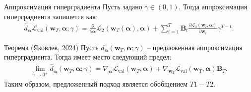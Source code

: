 \documentclass[aspectratio=169]{beamer}
\def\lval{\mathcal{L}_{\mathrm{val}}}
\newcommand{\vect}[1]{\boldsymbol{\mathbf{#1}}}
\begin{document}
\begin{frame}{Аппроксимация гиперградиента}
  Пусть задано $\gamma \in (0, 1)$. Тогда аппроксимация гиперградиента запишется как:
  \begin{align*}
    \hat{d}_{\boldsymbol{\alpha}}\lval(\vect{w}_T, \vect{\alpha}; \gamma) = \frac{\partial}{\partial \boldsymbol{\alpha}}\mathcal{L}_2(\mathbf{w}_T(\boldsymbol{\alpha}), \boldsymbol{\alpha}) +
    \sum_{t=1}^T \mathbf{B}_t\frac{\partial\mathcal{L}_2(\mathbf{w}_t, \boldsymbol{\alpha})}{\partial \mathbf{w}_t}\gamma^{T-t}.
  \end{align*}
  \begin{block}{Теорема (Яковлев, 2024)}
    Пусть $\hat{d}_{\vect{\alpha}}(\vect{w}_T, \vect{\alpha}; \gamma)$ -- предложенная аппроксимация гиперградиента. Тогда имеет место следующий предел:
    \begin{align}
        \lim_{\gamma \to 0^+}\hat{d}_{\vect{\alpha}}(\vect{w}_T, \vect{\alpha}; \gamma) = \nabla_{\vect{\alpha}}\lval(\vect{w}_T, \vect{\alpha}) + \nabla_{\vect{w}_T}\lval(\vect{w}_T, \vect{\alpha})\vect{B}_T.
    \end{align}
    Таким образом, предложенный подход является обобщением $T1-T2$.
  \end{block}
\end{frame}
\end{document}
